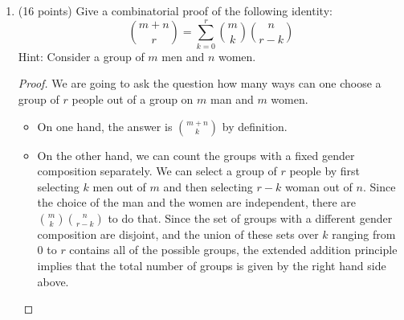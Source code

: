 \documentclass[12pt]{article}
\begin{document}
\begin{enumerate}
\begin{itemize}
\item This was the problem that has given you the biggest problem, the average score was $12.23$.
\item Many of you tricked yourself into circular reasoning. YOU CANNOT ASSUME WHAT YOU ARE TRYING TO PROVE. When you are proving that $xRx$ you cannot start your prove with `Assume $xRx$. This means...'. 
\item Many of you were in great confusion about what symmetric is.
\item I decided to grade leniently and if you wrote down the words reflexive, symmetric, transitive, you got 5 points on part (a). However, I was more tight fisted with further points.
\item Many of you didn't recognize a clearly wrong solution for the equivalence classes. If $[1]=\{1,9\}$, then it cannot be that $[9]=\{9\}$.
\item During the proof of part (a), many of you introduced unnecessary and confusiong notation. If you have $xRy$ then it is absolutely unnecessary to introduce a,b, and $c$.
\item Since there were many diverging versions, it was impossible to keep a consistent grading rubrik which resulted in a diversity of points. 
\end{itemize}
\newpage
\item (16 points) Give a combinatorial proof of the following identity:
\[
\binom{m+n}{r}=\sum_{k=0}^r\binom{m}{k}\binom{n}{r-k}
\] 
Hint: Consider a group of $m$ men and $n$ women.

\begin{proof}
We are going to ask the question how many ways can one choose a group of $r$ people out of a group on $m$ man and $m$ women. 

\begin{itemize}
\item On one hand, the answer is $\binom{m+n}{k}$ by definition.
\item On the other hand, we can count the groups with a fixed gender composition separately. We can select a group of $r$ people by first selecting $k$ men out of $m$ and then selecting $r-k$ woman out of $n$. Since the choice of the man and the women are independent, there are $\binom{m}{k}\binom{n}{r-k}$ to do that. Since the set of groups with a different gender composition are disjoint, and the union of these sets over $k$ ranging from $0$ to $r$ contains all of the possible groups, the extended addition principle implies that the total number of groups is given by the right hand side above.


\end{itemize}
\end{proof}
\end{enumerate}
\end{document}
